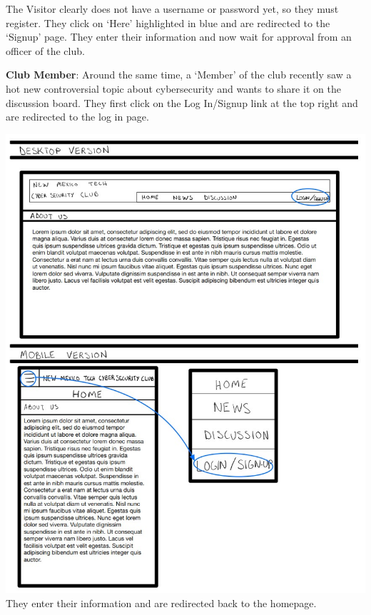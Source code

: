 \documentclass{article}
\begin{document}
\par The Visitor clearly does not have a username or password yet, so they must register.  They click on ‘Here’ highlighted in blue and are redirected to the ‘Signup’ page.  They enter their information and now wait for approval from an officer of the club.

\par
\textbf{Club Member}: Around the same time, a ‘Member’ of the club recently saw a hot new controversial topic about cybersecurity and wants to share it on the discussion board.  They first click on the Log In/Signup link at the top right and are redirected to the log in page.  
\par
\includegraphics[scale=0.60]{member_1.jpg} They enter their information and are redirected back to the homepage. 
\par
\end{document}
